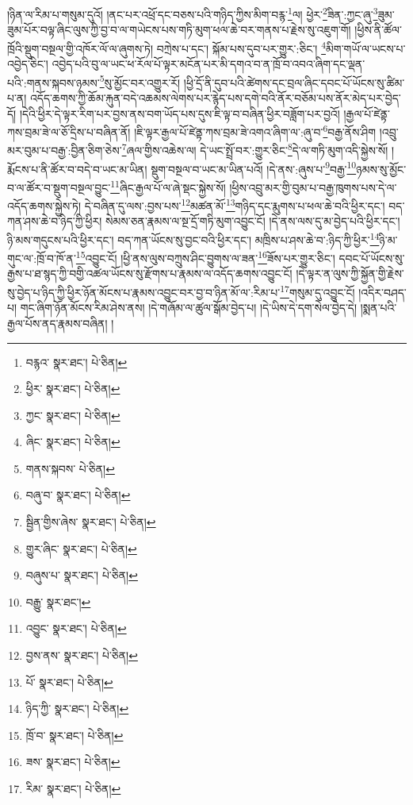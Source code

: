 །ཉིན་ལ་རིམ་པ་གསུམ་དུའོ། །ནང་པར་འཕྲོ་དང་བཅས་པའི་གཉིད་ཀྱིས་མིག་བརྙ་\footnote{བརྙའ་  སྣར་ཐང་།  པེ་ཅིན། }ལ། ཕྱེར་\footnote{ཕྱིར་  སྣར་ཐང་།  པེ་ཅིན། }ཟིན་:ཀྱང་ཞུ་\footnote{ཀྱང་  སྣར་ཐང་།  པེ་ཅིན། }ཟུམ་ཟུམ་པོར་བལྟ་ཞིང་ལུས་ཀྱི་བྱ་བ་ལ་གཡེངས་པས་གཏི་མུག་ཕལ་ཆེ་བར་གནས་པ་རྗེས་སུ་འཇུག་གོ། །ཕྱིས་ནི་ཚོལ་ཁྲོའི་སྡུག་བསྔལ་གྱི་འཁོར་ལོ་ལ་ཞུགས་ཏེ། བཀྲེས་པ་དང་། སྐོམ་པས་དུབ་པར་གྱུར་:ཅིང་། \footnote{ཞིང་  སྣར་ཐང་།  པེ་ཅིན། }མིག་གཡོ་ལ་ཡངས་པ་འབྱེད་ཅིང་། འབྱེད་པའི་བུ་ལ་ཡང་ཕ་རོལ་པོ་ལྟར་མངོན་པར་མི་དགའ་བ་ན་ཁྲོ་བ་འབའ་ཞིག་དང་ལྡན་པའི་:གནས་སྐབས་ཉམས་\footnote{གནས་སྐབས་  པེ་ཅིན། }སུ་མྱོང་བར་འགྱུར་རོ། །ཕྱི་དྲོ་ནི་དུབ་པའི་ཚེགས་དང་བྲལ་ཞིང་དབང་པོ་ཡོངས་སུ་ཚིམ་པ་ན། འདོད་ཆགས་ཀྱི་ཆོམ་རྐུན་བདེ་འཆམས་ལེགས་པར་རྙེད་པས་དགེ་བའི་ནོར་བཅོམ་པས་ནོར་མེད་པར་བྱེད་དོ། །དེའི་ཕྱིར་དེ་ལྟར་རིག་པར་བྱས་ནས་བག་ཡོད་པས་དུས་ཇི་ལྟ་བ་བཞིན་ཕྱིར་བཟློག་པར་བྱའོ། །རྒྱལ་པོ་ཛེནྟ་ཀས་བྲམ་ཟེ་ལ་ཅོ་དྲིས་པ་བཞིན་ནོ། །ཇི་ལྟར་རྒྱལ་པོ་ཛེནྟ་ཀས་བྲམ་ཟེ་འགའ་ཞིག་ལ་:ཞུ་བ་\footnote{བཞུ་བ་  སྣར་ཐང་།  པེ་ཅིན། }བརྒྱ་ནོས་ཤིག །འབྲུ་མར་བུམ་པ་བརྒྱ་:བྱིན་ཅིག་ཅེས་\footnote{སྦྱིན་གྱིས་ཞེས་  སྣར་ཐང་།  པེ་ཅིན། }ཞལ་གྱིས་འཆེས་ལ། དེ་ཡང་སྤྲོ་བར་:གྱུར་ཅིང་\footnote{གྱུར་ཞིང་  སྣར་ཐང་།  པེ་ཅིན། }དེ་ལ་གཏི་མུག་འདི་སྐྱེས་སོ། །རྨོངས་པ་ནི་ཚོར་བ་བདེ་བ་ཡང་མ་ཡིན། སྡུག་བསྔལ་བ་ཡང་མ་ཡིན་པའོ། །དེ་ནས་:ཞུས་པ་\footnote{བཞུས་པ་  སྣར་ཐང་།  པེ་ཅིན། }བརྒྱ་\footnote{བརྒྱུ་  སྣར་ཐང་། }ཉམས་སུ་མྱོང་བ་ལ་ཚོར་བ་སྡུག་བསྔལ་བྱུང་\footnote{འབྱུང་  སྣར་ཐང་།  པེ་ཅིན། }ཞིང་རྒྱལ་པོ་ལ་ཞེ་སྡང་སྐྱེས་སོ། །ཕྱིས་འབྲུ་མར་གྱི་བུམ་པ་བརྒྱ་ཁུགས་པས་དེ་ལ་འདོད་ཆགས་སྐྱེས་ཏེ། དེ་བཞིན་དུ་ལས་:བྱས་པས་\footnote{བྱས་ནས་  སྣར་ཐང་།  པེ་ཅིན། }མཚན་མོ་\footnote{པོ་  སྣར་ཐང་།  པེ་ཅིན། }གཉིད་དང་རྨུགས་པ་ཕལ་ཆེ་བའི་ཕྱིར་དང་། བད་ཀན་ཤས་ཆེ་བ་ཉིད་ཀྱི་ཕྱིར། སེམས་ཅན་རྣམས་ལ་སྔ་དྲོ་གཏི་མུག་འབྱུང་ངོ། །དེ་ནས་ལས་དུ་མ་བྱེད་པའི་ཕྱིར་དང་། ཉི་མས་གདུངས་པའི་ཕྱིར་དང་། བད་ཀན་ཡོངས་སུ་བྱང་བའི་ཕྱིར་དང་། མཁྲིས་པ་ཤས་ཆེ་བ་:ཉིད་ཀྱི་ཕྱིར་\footnote{ཉིད་ཀྱི་  སྣར་ཐང་།  པེ་ཅིན། }ཉི་མ་གུང་ལ་:ཁྲོ་བ་ཁོ་ན་\footnote{ཁྲོ་བ་  སྣར་ཐང་།  པེ་ཅིན། }འབྱུང་ངོ། །ཕྱི་ནས་ལུས་བཀྲུས་ཤིང་བྱུགས་ལ་ཟན་\footnote{ཟས་  སྣར་ཐང་།  པེ་ཅིན། }ཟོས་པར་གྱུར་ཅིང་། དབང་པོ་ཡོངས་སུ་རྒྱས་པ་ཐ་སྙད་ཀྱི་བགྱི་འཚལ་ཡོངས་སུ་རྫོགས་པ་རྣམས་ལ་འདོད་ཆགས་འབྱུང་ངོ། །དེ་ལྟར་ན་ལུས་ཀྱི་སྐྱོན་གྱི་རྗེས་སུ་བྱེད་པ་ཉིད་ཀྱི་ཕྱིར་ཉོན་མོངས་པ་རྣམས་འབྱུང་བར་བྱ་བ་ཉིན་མོ་ལ་:རིམ་པ་\footnote{རིམ་  སྣར་ཐང་།  པེ་ཅིན། }གསུམ་དུ་འབྱུང་ངོ། །འདིར་བཤད་པ། གང་ཞིག་ཉོན་མོངས་རིམ་ཤེས་ནས། །དེ་གཞོམ་ལ་ཚུལ་སྒོམ་བྱེད་པ། །དེ་ཡིས་དེ་དག་སེལ་བྱེད་དེ། །སྨན་པའི་རྒྱལ་པོས་ནད་རྣམས་བཞིན། །
